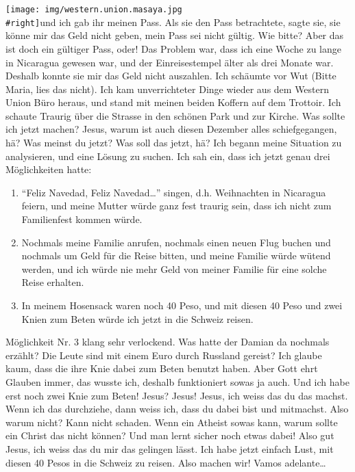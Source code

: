 \documentclass[
]{article}
\begin{document}
\texttt{[image: img/western.union.masaya.jpg\\\#right]}und ich gab ihr
meinen Pass. Als sie den Pass betrachtete, sagte sie, sie könne mir das
Geld nicht geben, mein Pass sei nicht gültig. Wie bitte? Aber das ist
doch ein gültiger Pass, oder! Das Problem war, dass ich eine Woche zu
lange in Nicaragua gewesen war, und der Einreisestempel älter als drei
Monate war. Deshalb konnte sie mir das Geld nicht auszahlen. Ich
schäumte vor Wut (Bitte Maria, lies das nicht). Ich kam unverrichteter
Dinge wieder aus dem Western Union Büro heraus, und stand mit meinen
beiden Koffern auf dem Trottoir. Ich schaute Traurig über die Strasse in
den schönen Park und zur Kirche. Was sollte ich jetzt machen? Jesus,
warum ist auch diesen Dezember alles schiefgegangen, hä? Was meinst du
jetzt? Was soll das jetzt, hä? Ich begann meine Situation zu
analysieren, und eine Lösung zu suchen. Ich sah ein, dass ich jetzt
genau drei Möglichkeiten hatte:

\begin{enumerate}
\def\labelenumi{\arabic{enumi}.}
\item
  ``Feliz Navedad, Feliz Navedad\ldots{}'' singen, d.h. Weihnachten in
  Nicaragua feiern, und meine Mutter würde ganz fest traurig sein, dass
  ich nicht zum Familienfest kommen würde.
\item
  Nochmals meine Familie anrufen, nochmals einen neuen Flug buchen und
  nochmals um Geld für die Reise bitten, und meine Familie würde wütend
  werden, und ich würde nie mehr Geld von meiner Familie für eine solche
  Reise erhalten.
\item
  In meinem Hosensack waren noch 40 Peso, und mit diesen 40 Peso und
  zwei Knien zum Beten würde ich jetzt in die Schweiz reisen.
\end{enumerate}

Möglichkeit Nr. 3 klang sehr verlockend. Was hatte der Damian da
nochmals erzählt? Die Leute sind mit einem Euro durch Russland gereist?
Ich glaube kaum, dass die ihre Knie dabei zum Beten benutzt haben. Aber
Gott ehrt Glauben immer, das wusste ich, deshalb funktioniert sowas ja
auch. Und ich habe erst noch zwei Knie zum Beten! Jesus? Jesus! Jesus,
ich weiss das du das machst. Wenn ich das durchziehe, dann weiss ich,
dass du dabei bist und mitmachst. Also warum nicht? Kann nicht schaden.
Wenn ein Atheist sowas kann, warum sollte ein Christ das nicht können?
Und man lernt sicher noch etwas dabei! Also gut Jesus, ich weiss das du
mir das gelingen lässt. Ich habe jetzt einfach Lust, mit diesen 40 Pesos
in die Schweiz zu reisen. Also machen wir! Vamos adelante\ldots{}
\end{document}
